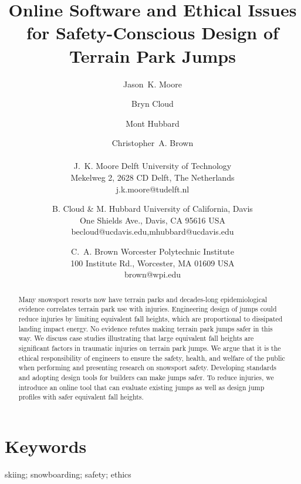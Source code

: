 \documentclass{article}
\begin{document}
\title{Online Software and Ethical Issues for Safety-Conscious Design of Terrain Park Jumps}

\author{
  Jason~K. Moore \and
  Bryn Cloud \and
  Mont Hubbard \and
  Christopher~A. Brown \\\\
  J.~K. Moore
  Delft University of Technology\\
  Mekelweg 2, 2628 CD Delft, The Netherlands\\
  j.k.moore@tudelft.nl
  \and
  B. Cloud \& M. Hubbard
  University of California, Davis\\
  One Shields Ave., Davis, CA 95616 USA\\
  becloud@ucdavis.edu,mhubbard@ucdavis.edu
  \and
  C.~A. Brown
  Worcester Polytechnic Institute\\
  100 Institute Rd., Worcester, MA 01609 USA\\
  brown@wpi.edu
}

\maketitle

\begin{abstract}
  Many snowsport resorts now have terrain parks and decades-long
  epidemiological evidence correlates terrain park use with injuries.
  Engineering design of jumps could reduce injuries by limiting equivalent fall
  heights, which are proportional to dissipated landing impact energy.  No
  evidence refutes making terrain park jumps safer in this way. We discuss case
  studies illustrating that large equivalent fall heights are significant
  factors in traumatic injuries on terrain park jumps. We argue that it is the
  ethical responsibility of engineers to ensure the safety, health, and welfare
  of the public when performing and presenting research on snowsport safety.
  Developing standards and adopting design tools for builders can make jumps
  safer. To reduce injuries, we introduce an online tool that can evaluate
  existing jumps as well as design jump profiles with safer equivalent fall
  heights.
\end{abstract}

\section*{Keywords}

skiing; snowboarding; safety; ethics
\end{document}
